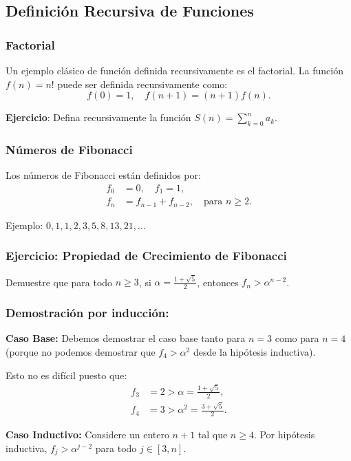 \subsection{Definición Recursiva de Funciones}
\subsubsection{Factorial}
Un ejemplo clásico de función definida recursivamente es el factorial. La función $f(n) = n!$ puede ser definida recursivamente como:
\[
    f(0) = 1, \quad f(n+1) = (n+1)f(n).
\]

\bigskip
\noindent \textbf{Ejercicio}: Defina recursivamente la función $S(n) = \sum_{k=0}^{n} a_k$.

\subsubsection{Números de Fibonacci}
Los números de Fibonacci están definidos por:
\begin{align*}
    f_0 &= 0, \quad f_1 = 1, \\
    f_n &= f_{n-1} + f_{n-2}, \quad \text{para } n \geq 2.
\end{align*}

Ejemplo: $0, 1, 1, 2, 3, 5, 8, 13, 21, \dots$

\subsubsection*{Ejercicio: Propiedad de Crecimiento de Fibonacci}
Demuestre que para todo $n \geq 3$, si $\alpha = \frac{1 + \sqrt{5}}{2}$, entonces $f_n > \alpha^{n-2}$.
\subsubsection*{Demostración por inducción:}
\noindent \textbf{Caso Base:} Debemos demostrar el caso base tanto para $n=3$ como para $n=4$ (porque no podemos demostrar que $f_4 > \alpha^2$ desde la hipótesis inductiva).

Esto no es difícil puesto que:
\begin{align*}
    f_3 &= 2 > \alpha = \frac{1 + \sqrt{5}}{2}, \\
    f_4 &= 3 > \alpha^2 = \frac{3 + \sqrt{5}}{2}.
\end{align*}

\noindent \textbf{Caso Inductivo:} Considere un entero $n + 1$ tal que $n \geq 4$. Por hipótesis inductiva, $f_j > \alpha^{j-2}$ para todo $j \in [3, n]$.

